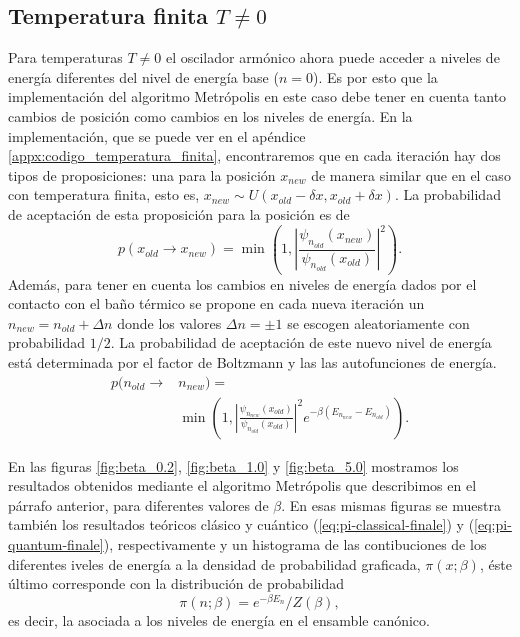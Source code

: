 \documentclass[%
 reprint,
 amsmath,amssymb,
 aps,
 pra,
]{revtex4-2}
\begin{document}
\subsection{Temperatura finita \texorpdfstring{$T \neq 0$}{T diferente de cero}\label{subsec:temperatura-finita}}
Para temperaturas $T\neq0$ el oscilador armónico ahora puede acceder a niveles de energía diferentes del nivel de energía base  ($n=0$). Es por esto que la implementación del algoritmo Metrópolis en este caso debe tener en cuenta tanto cambios de posición como cambios en los niveles de energía. En la implementación, que se puede ver en el apéndice \ref{appx:codigo_temperatura_finita}, encontraremos que en cada iteración hay dos tipos de proposiciones: una para la posición $x_{new}$ de manera similar que en el caso con temperatura finita, esto es, $x_{new} \sim U(x_{old} - \delta x, x_{old} + \delta x)$. La probabilidad de aceptación de esta proposición para la posición es de 
\begin{equation}
	p(x_{old} \rightarrow x_{new}) = \min\left(1,\left|\frac{\psi_{n_{old}}(x_{new})}{\psi_{n_{old}}(x_{old})}\right|^2\right).
\end{equation}
Además, para tener en cuenta los cambios en niveles de energía dados por el contacto con el baño térmico se propone en cada nueva iteración un $n_{new}=n_{old} + \Delta n$ donde los valores $\Delta n = \pm 1$ se escogen aleatoriamente con probabilidad $1/2$. La probabilidad de aceptación de este nuevo nivel de energía está determinada por el factor de Boltzmann y las las autofunciones de energía.
\begin{align}
	p(n_{old} \rightarrow 	& n_{new}) = \nonumber \\
							& \min\left(1,\left|\frac{\psi_{n_{new}}(x_{old})}{\psi_{n_{old}}(x_{old})}\right|^2 e^{-\beta\left(E_{n_{new}}-E_{n_{old}}\right)}\right).
\end{align}

En las figuras \ref{fig:beta_0.2}, \ref{fig:beta_1.0} y \ref{fig:beta_5.0} mostramos los resultados obtenidos mediante el algoritmo Metrópolis que describimos en el párrafo anterior, para diferentes valores de $\beta$. En esas mismas figuras se muestra también los resultados teóricos clásico y cuántico (\ref{eq:pi-classical-finale}) y (\ref{eq:pi-quantum-finale}), respectivamente y un histograma de las contibuciones de los diferentes iveles de energía a la densidad de probabilidad graficada, $\pi(x;\beta)$, éste último corresponde con la 	distribución de probabilidad 
\begin{equation}
\pi(n;\beta)=e^{-\beta E_n }/Z(\beta),  \label{eq:pi-energy-levels}
\end{equation}
es decir, la asociada a los niveles de energía en el ensamble canónico.
\end{document}
